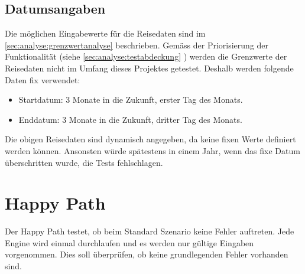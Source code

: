 \subsection{Datumsangaben}
Die möglichen Eingabewerte für die Reisedaten sind im \cref{sec:analyse:grenzwertanalyse}  beschrieben.
Gemäss der Priorisierung der Funktionalität (siehe  \cref{sec:analyse:testabdeckung} ) werden die Grenzwerte der Reisedaten nicht im Umfang dieses Projektes getestet. Deshalb werden folgende Daten fix verwendet:

\begin{itemize}
\item Startdatum: 3 Monate in die Zukunft, erster Tag des Monats.
\item Enddatum: 3 Monate in die Zukunft, dritter Tag des Monats.
\end{itemize}
\vspace{0 mm}
Die obigen Reisedaten sind dynamisch angegeben, da keine fixen Werte definiert werden können. Ansonsten würde spätestens in einem Jahr, wenn das fixe Datum überschritten wurde, die Tests fehlschlagen.

\section{Happy Path}
Der Happy Path testet, ob beim Standard Szenario keine Fehler auftreten. Jede Engine wird einmal durchlaufen und es werden nur gültige Eingaben vorgenommen. Dies soll überprüfen, ob keine grundlegenden Fehler vorhanden sind.







